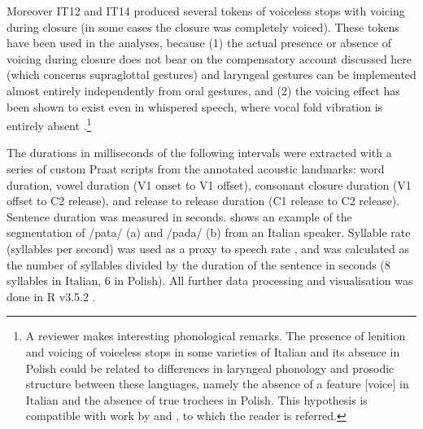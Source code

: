 \documentclass[charis]{glossa}
\begin{document}
Moreover IT12 and IT14 produced several tokens of voiceless stops with
voicing during closure (in some cases the closure was completely
voiced). These tokens have been used in the analyses, because (1) the
actual presence or absence of voicing during closure does not bear on
the compensatory account discussed here (which concerns supraglottal
gestures) and laryngeal gestures can be implemented almost entirely
independently from oral gestures, and (2) the voicing effect has been
shown to exist even in whispered speech, where vocal fold vibration is
entirely absent
\citep{sharf1964}.\footnote{A reviewer makes interesting phonological remarks. The presence of lenition and voicing of voiceless stops in some varieties of Italian and its absence in Polish could be related to differences in laryngeal phonology and prosodic structure between these languages, namely the absence of a feature [voice] in Italian and the absence of true trochees in Polish. This hypothesis is compatible with work by \citet{schwartz2018} and \citet{schwartz2016}, to which the reader is referred.}

The durations in milliseconds of the following intervals were extracted
with a series of custom Praat scripts from the annotated acoustic
landmarks: word duration, vowel duration (V1 onset to V1 offset),
consonant closure duration (V1 offset to C2 release), and release to
release duration (C1 release to C2 release). Sentence duration was
measured in seconds.  shows an example of the
segmentation of /pata/ (a) and /pada/ (b) from an Italian speaker.
Syllable rate (syllables per second) was used as a proxy to speech rate
\citep{plug2018a}, and was calculated as the number of syllables divided
by the duration of the sentence in seconds (8 syllables in Italian, 6 in
Polish). All further data processing and visualisation was done in R
v3.5.2 \citep{r-core-team2018, wickham2017}.
\end{document}
